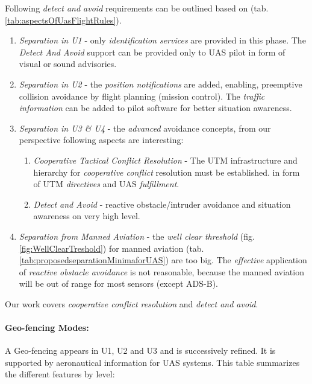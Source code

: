 \noindent Following \emph{detect and avoid} requirements can be outlined based on (tab. \ref{tab:aspectsOfUasFlightRules}).
\begin{enumerate}
    \item \emph{Separation in U1} - only \emph{identification services} are provided in this phase. The \emph{Detect And Avoid} support can be provided only to UAS pilot in form of visual or sound advisories. 
    
    \item \emph{Separation in U2} - the \emph{position notifications} are added, enabling, preemptive collision avoidance by flight planning (mission control). The \emph{traffic information} can be added to pilot software for better situation awareness.  

\newpage
    
    \item \emph{Separation in U3 \& U4} - the \emph{advanced} avoidance concepts, from our perspective following aspects are interesting: 
    \begin{enumerate}[a]
        \item \emph{Cooperative Tactical Conflict Resolution} - The UTM infrastructure and hierarchy for \emph{cooperative conflict} resolution must be established. in form of UTM \emph{directives} and UAS \emph{fulfillment}.
        
        \item \emph{Detect and Avoid} - reactive obstacle/intruder avoidance and situation awareness on very high level.
    \end{enumerate}
    
    \item \emph{Separation from Manned Aviation} - the \emph{well clear threshold} (fig. \ref{fig:WellClearTreshold}) for manned aviation  (tab.\ref{tab:proposedseparationMinimaforUAS}) are too big. The \emph{effective} application of \emph{reactive obstacle avoidance} is not reasonable, because the manned aviation will be out of range for most sensors (except ADS-B).
\end{enumerate}

\begin{note}
    Our work covers \emph{cooperative conflict resolution} and \emph{detect and avoid}.
\end{note}

\paragraph{Geo-fencing Modes:} A Geo-fencing appears in U1, U2 and U3 and is successively refined. It is supported by aeronautical information for UAS systems. This table summarizes the different features by level:


